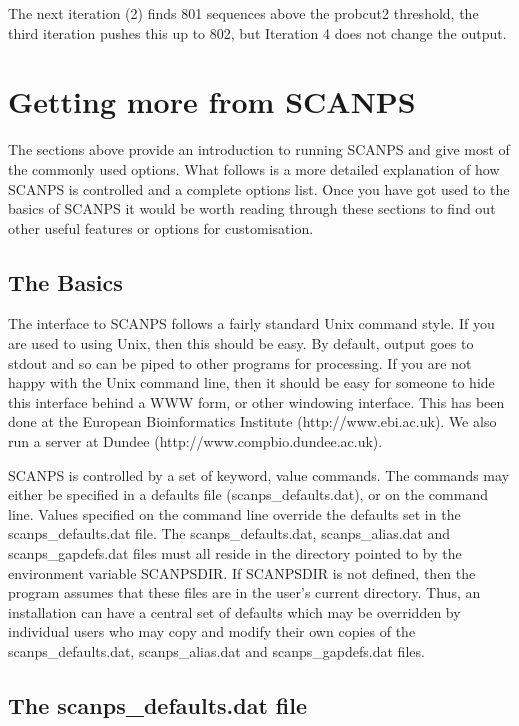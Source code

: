 \documentclass[12pt]{article}
\begin{document}
The next iteration (2) finds 801 sequences above the probcut2
threshold, the third iteration pushes this up to 802, but Iteration 4
does not change the output.


\section{Getting more from SCANPS}

The sections above provide an introduction to running SCANPS and give
most of the commonly used options.  What follows is a more detailed
explanation of how SCANPS is controlled and a complete options list.
Once you have got used to the basics of SCANPS it would be worth
reading through these sections to find out other useful features or
options for customisation.


\subsection{The Basics}

The interface to SCANPS follows a fairly standard Unix command style.
If you are used to using Unix, then this should be easy.  By default,
output goes to stdout and so can be piped to other programs for
processing.  If you are not happy with the Unix command line, then it
should be easy for someone to hide this interface behind a WWW form,
or other windowing interface.  This has been done at the European
Bioinformatics Institute (http://www.ebi.ac.uk).  We also run a server
at Dundee (http://www.compbio.dundee.ac.uk).

SCANPS is controlled by a set of keyword, value commands.  The
commands may either be specified in a defaults file
(scanps\_defaults.dat), or on the command line.  Values specified on
the command line override the defaults set in the scanps\_defaults.dat
file.  The scanps\_defaults.dat, scanps\_alias.dat and
scanps\_gapdefs.dat files must all reside in the directory pointed to
by the environment variable SCANPSDIR.  If SCANPSDIR is not defined,
then the program assumes that these files are in the user's current
directory.  Thus, an installation can have a central set of defaults
which may be overridden by individual users who may copy and modify
their own copies of the scanps\_defaults.dat, scanps\_alias.dat and
scanps\_gapdefs.dat files.


\subsection{The scanps\_defaults.dat file}
\end{document}
